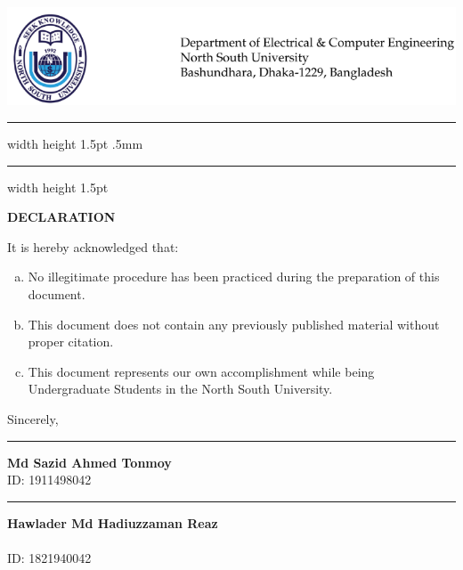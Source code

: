 
\chapter*{}
\vspace*{-5cm}

{\centering \includegraphics[width=\linewidth, scale=1]{01_Declaration/letterhead.png}}
{\hrule width \hsize height 1.5pt \kern .5mm \hrule width \hsize height 1.5pt}
\vspace*{2ex}
\begin{center}
\textbf{\Large DECLARATION}
\end{center}
\vspace{2ex}
It is hereby acknowledged that: 
\begin{enumerate}[a.]
	\item No illegitimate procedure has been practiced during the preparation of this document.
	\item This document does not contain any previously published material without proper citation.
	\item This document represents our own accomplishment while being Undergraduate Students in the North South University.
\end{enumerate}
Sincerely,\\
\vspace{4em}
\begin{minipage}[t]{0.35\textwidth} 
\end{minipage}%
\hfill
\vspace*{15pt}
\begin{center}
\begin{minipage}{0.4\textwidth}
    \hrule\vspace{2ex}
    \begin{flushleft}
    {\small {\bfseries Md Sazid Ahmed Tonmoy}\\
    ID: 1911498042\\}
    \end{flushleft}
\end{minipage}
\hfill
\begin{minipage}{0.4\textwidth}
    \begin{flushright}
    \hrule\vspace{2ex}
    {\small {\bfseries Hawlader Md Hadiuzzaman Reaz}\\\\
    ID: 1821940042\\}
    \end{flushright}
\end{minipage}
\end{center}
\let\cleardoublepage\clearpage

